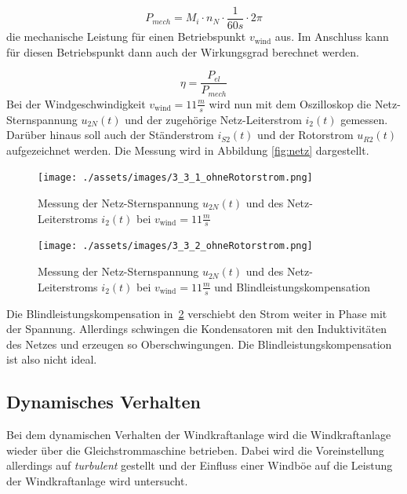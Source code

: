 \documentclass{report}
\begin{document}
\begin{equation}
  \label{eq:3}
  P_{mech} = M_{i} \cdot n_{N} \cdot \frac{1}{60s} \cdot 2\pi
\end{equation}
die mechanische Leistung für einen Betriebspunkt $v_{\mathrm{wind}}$ aus. Im Anschluss kann für diesen Betriebspunkt dann auch der Wirkungsgrad berechnet werden.

\begin{equation}
  \label{eq:2}
  \eta = \frac{P_{el}}{P_{mech}}
\end{equation}
Bei der Windgeschwindigkeit $v_{\mathrm{wind}} = 11 \frac{m}{s}$ wird nun mit dem Oszilloskop die Netz-Sternspannung $u_{2N}(t)$ und der zugehörige Netz-Leiterstrom $i_{2}(t)$ gemessen. Darüber hinaus soll auch der Ständerstrom $i_{S2}(t)$ und der Rotorstrom $u_{R2}(t)$ aufgezeichnet werden. Die Messung wird in Abbildung \ref{fig:netz} dargestellt.

\begin{figure}[!ht]
	\centering
	\texttt{[image: ./assets/images/3\_3\_1\_ohneRotorstrom.png]}
	\caption{Messung der Netz-Sternspannung $u_{2N}(t)$ und des Netz-Leiterstroms $i_{2}(t)$ bei $v_{\mathrm{wind}} = 11 \frac{m}{s}$}
	\label{fig:oszi_direkt_spannung}
\end{figure}

\begin{figure}[!ht]
	\centering
	\texttt{[image: ./assets/images/3\_3\_2\_ohneRotorstrom.png]}
	\caption{Messung der Netz-Sternspannung $u_{2N}(t)$ und des Netz-Leiterstroms $i_{2}(t)$ bei $v_{\mathrm{wind}} = 11 \frac{m}{s}$ und Blindleistungskompensation}
	\label{fig:oszi_direkt_spannung_mitKomp}
\end{figure}

Die Blindleistungskompensation in~\ref{fig:oszi_direkt_spannung_mitKomp} verschiebt den Strom weiter in Phase mit der Spannung. Allerdings schwingen die Kondensatoren mit den Induktivitäten des Netzes und erzeugen so Oberschwingungen. Die Blindleistungskompensation ist also nicht ideal.


\subsection{Dynamisches Verhalten}

Bei dem dynamischen Verhalten der Windkraftanlage wird die Windkraftanlage wieder über die Gleichstrommaschine betrieben. Dabei wird die Voreinstellung allerdings auf \textit{turbulent} gestellt und der Einfluss einer Windböe auf die Leistung der Windkraftanlage wird untersucht.
\end{document}
